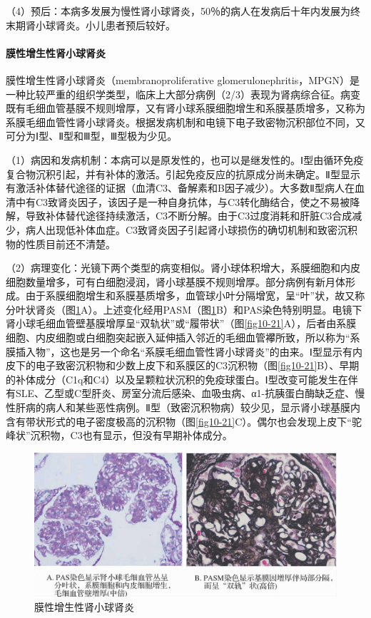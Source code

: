 （4）预后：本病多发展为慢性肾小球肾炎，50％的病人在发病后十年内发展为终末期肾小球肾炎。小儿患者预后较好。

\paragraph{膜性增生性肾小球肾炎}
膜性增生性肾小球肾炎（membranoproliferative
glomerulonephritis，MPGN）是一种比较严重的组织学类型，临床上大部分病例（2/3）表现为肾病综合征。病变既有毛细血管基膜不规则增厚，又有肾小球系膜细胞增生和系膜基质增多，又称为系膜毛细血管性肾小球肾炎。根据发病机制和电镜下电子致密物沉积部位不同，又可分为Ⅰ型、Ⅱ型和Ⅲ型，Ⅲ型极为少见。

（1）病因和发病机制：本病可以是原发性的，也可以是继发性的。Ⅰ型由循环免疫复合物沉积引起，并有补体的激活。引起免疫反应的抗原成分尚未确定。Ⅱ型显示有激活补体替代途径的证据（血清C3、备解素和B因子减少）。大多数Ⅱ型病人在血清中有C3致肾炎因子，该因子是一种自身抗体，与C3转化酶结合，使之不易被降解，导致补体替代途径持续激活，C3不断分解。由于C3过度消耗和肝脏C3合成减少，病人出现低补体血症。C3致肾炎因子引起肾小球损伤的确切机制和致密沉积物的性质目前还不清楚。

（2）病理变化：光镜下两个类型的病变相似。肾小球体积增大，系膜细胞和内皮细胞数量增多，可有白细胞浸润，肾小球基膜不规则增厚。部分病例有新月体形成。由于系膜细胞增生和系膜基质增多，血管球小叶分隔增宽，呈“叶”状，故又称分叶状肾炎（图\ref{fig10-20}A）。上述变化经用PASM（图\ref{fig10-20}B）和PAS染色特别明显。电镜下肾小球毛细血管壁基膜增厚呈“双轨状”或“履带状”（图\ref{fig10-21}A），后者由系膜细胞、内皮细胞或白细胞突起嵌入延伸插入邻近的毛细血管襻所致，所以称为“系膜插入物”，这也是另一个命名“系膜毛细血管性肾小球肾炎”的由来。Ⅰ型显示有内皮下的电子致密沉积物和少数上皮下和系膜区的C3沉积物（图\ref{fig10-21}B）、早期的补体成分（C1q和C4）以及呈颗粒状沉积的免疫球蛋白。Ⅰ型改变可能发生在伴有SLE、乙型或C型肝炎、房室分流后感染、血吸虫病、α1-抗胰蛋白酶缺乏症、慢性肝病的病人和某些恶性病例。Ⅱ型（致密沉积物病）较少见，显示肾小球基膜内含有带状形式的电子密度极高的沉积物（图\ref{fig10-21}C）。偶尔也会发现上皮下“驼峰状”沉积物，C3也有显示，但没有早期补体成分。

\begin{figure}[!htbp]
 \centering
 \includegraphics{./images/Image00168.jpg}
 \captionsetup{justification=centering}
 \caption{膜性增生性肾小球肾炎}
 \label{fig10-20}
  \end{figure} 

